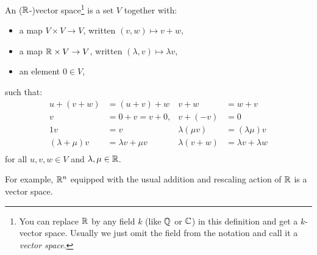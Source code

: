 \documentclass{article}
\begin{document}
\begin{Definition}
An (\(\mathbb{R}\)-)vector space\footnote{You can replace \(\mathbb{R}\) by any
field \(k\) (like \(\mathbb{Q}\) or \(\mathbb{C}\)) in this definition and get a
\(k\)-vector space. Usually we just omit the field from the notation
and call it a {\em vector space}.} is a set \(V\) together with:
\begin{itemize}
\item a map \(V\times V\to V\), written \((v,w)\mapsto v+w\),
\item a map \(\mathbb{R}\times V\to V\), written \((\lambda,v)\mapsto \lambda
v\),
\item an element \(0\in V\),
\end{itemize}
such that:
\begin{align*}
u+(v+w)&=(u+v)+w& v+w&=w+v\\
v&=0+v=v+0,&v+(-v)&=0\\
1v&=v&\lambda(\mu v)&=(\lambda\mu)v\\
(\lambda+\mu)v&=\lambda v+\mu v&\lambda(v+w)&=\lambda v+\lambda w\\
\end{align*}
for all \(u,v,w\in V\) and \(\lambda,\mu\in\mathbb{R}\).


\end{Definition}
For example, \(\mathbb{R}^n\) equipped with the usual addition and rescaling
action of \(\mathbb{R}\) is a vector space.
\end{document}
